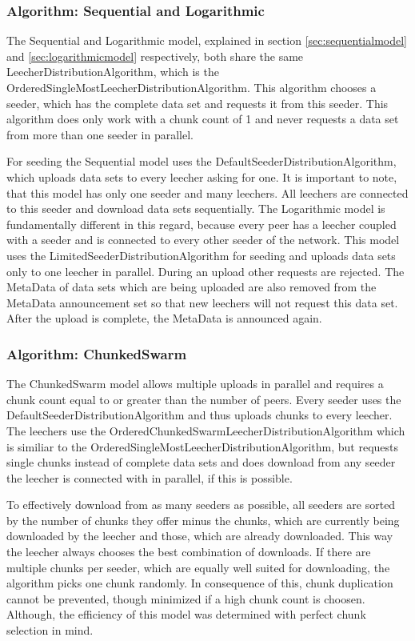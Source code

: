 \subsubsection{Algorithm: Sequential and Logarithmic}
\label{subsubsec:seqlog}
The Sequential and Logarithmic model, explained in section \ref{sec:sequentialmodel} and \ref{sec:logarithmicmodel} respectively, both share the same LeecherDistributionAlgorithm, which is the OrderedSingleMostLeecherDistributionAlgorithm. This algorithm chooses a seeder, which has the complete data set and requests it from this seeder. This algorithm does only work with a chunk count of 1 and never requests a data set from more than one seeder in parallel.

For seeding the Sequential model uses the DefaultSeederDistributionAlgorithm, which uploads data sets to every leecher asking for one. It is important to note, that this model has only one seeder and many leechers. All leechers are connected to this seeder and download data sets sequentially. The Logarithmic model is fundamentally different in this regard, because every peer has a leecher coupled with a seeder and is connected to every other seeder of the network. This model uses the LimitedSeederDistributionAlgorithm for seeding and uploads data sets only to one leecher in parallel. During an upload other requests are rejected. The MetaData of data sets which are being uploaded are also removed from the MetaData announcement set so that new leechers will not request this data set. After the upload is complete, the MetaData is announced again.

\subsubsection{Algorithm: ChunkedSwarm}
\label{subsubsec:chunkedswarm}
The ChunkedSwarm model allows multiple uploads in parallel and requires a chunk count equal to or greater than the number of peers. Every seeder uses the DefaultSeederDistributionAlgorithm and thus uploads chunks to every leecher. The leechers use the OrderedChunkedSwarmLeecherDistributionAlgorithm which is similiar to the OrderedSingleMostLeecherDistributionAlgorithm, but requests single chunks instead of complete data sets and does download from any seeder the leecher is connected with in parallel, if this is possible. 

To effectively download from as many seeders as possible, all seeders are sorted by the number of chunks they offer minus the chunks, which are currently being downloaded by the leecher and those, which are already downloaded. This way the leecher always chooses the best combination of downloads. If there are multiple chunks per seeder, which are equally well suited for downloading, the algorithm picks one chunk randomly. In consequence of this, chunk duplication cannot be prevented, though minimized if a high chunk count is choosen. Although, the efficiency of this model was determined with perfect chunk selection in mind. 

